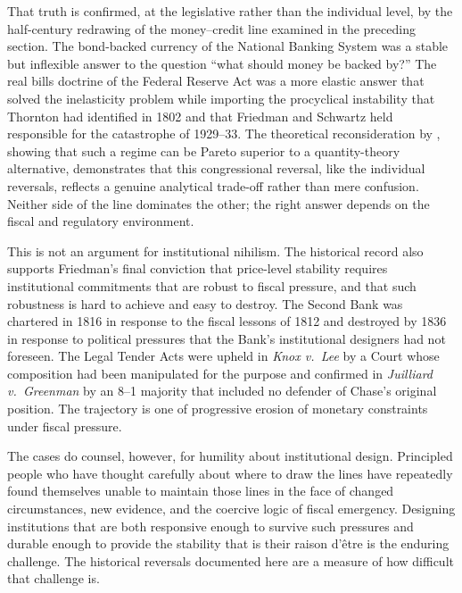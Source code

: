 \documentclass[12pt]{article}
\begin{document}
That truth is confirmed, at the legislative rather than the individual
level, by the half-century redrawing of the money--credit line examined
in the preceding section.  The bond-backed currency of the National
Banking System was a stable but inflexible answer to the question ``what
should money be backed by?''  The real bills doctrine of the Federal
Reserve Act was a more elastic answer that solved the inelasticity problem
while importing the procyclical instability that Thornton had identified
in 1802 and that Friedman and Schwartz held responsible for the
catastrophe of 1929--33.  The theoretical reconsideration by
\citet{SargentWallace1982}, showing that such a regime can be Pareto
superior to a quantity-theory alternative, demonstrates that this
congressional reversal, like the individual reversals, reflects a genuine
analytical trade-off rather than mere confusion.  Neither side of the line
dominates the other; the right answer depends on the fiscal and regulatory
environment.

This is not an argument for institutional nihilism.  The historical
record also supports Friedman's final conviction that price-level
stability requires institutional commitments that are robust to fiscal
pressure, and that such robustness is hard to achieve and easy to
destroy.  The Second Bank was chartered in 1816 in response to the
fiscal lessons of 1812 and destroyed by 1836 in response to political
pressures that the Bank's institutional designers had not foreseen.
The Legal Tender Acts were upheld in \textit{Knox v.\ Lee} by a Court
whose composition had been manipulated for the purpose and confirmed in
\textit{Juilliard v.\ Greenman} by an 8--1 majority that included no
defender of Chase's original position.  The trajectory is one of
progressive erosion of monetary constraints under fiscal pressure.

The cases do counsel, however, for humility about institutional design.
Principled people who have thought carefully about where to draw the lines
have repeatedly found themselves unable to maintain those lines in the
face of changed circumstances, new evidence, and the coercive logic of
fiscal emergency.  Designing institutions that are both responsive enough
to survive such pressures and durable enough to provide the stability
that is their raison d'\^etre is the enduring challenge.  The historical
reversals documented here are a measure of how difficult that challenge
is.

\bigskip



\end{document}
